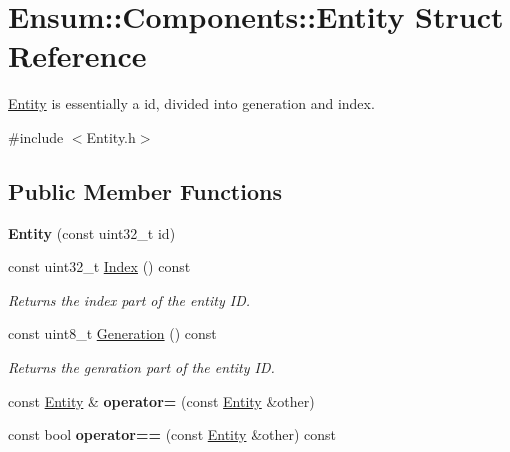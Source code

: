 \hypertarget{struct_ensum_1_1_components_1_1_entity}{}\section{Ensum\+:\+:Components\+:\+:Entity Struct Reference}
\label{struct_ensum_1_1_components_1_1_entity}


\hyperlink{struct_ensum_1_1_components_1_1_entity}{Entity} is essentially a id, divided into generation and index.  




{\ttfamily \#include $<$Entity.\+h$>$}

\subsection*{Public Member Functions}
\begin{DoxyCompactItemize}
\item 
{\bfseries Entity} (const uint32\+\_\+t id)\hypertarget{struct_ensum_1_1_components_1_1_entity_a4eacdb9354583a1b2a946c4b18ec32af}{}\label{struct_ensum_1_1_components_1_1_entity_a4eacdb9354583a1b2a946c4b18ec32af}

\item 
const uint32\+\_\+t \hyperlink{struct_ensum_1_1_components_1_1_entity_a166ed226733f98a44407dea8d00d3293}{Index} () const \hypertarget{struct_ensum_1_1_components_1_1_entity_a166ed226733f98a44407dea8d00d3293}{}\label{struct_ensum_1_1_components_1_1_entity_a166ed226733f98a44407dea8d00d3293}

\begin{DoxyCompactList}\small\item\em Returns the index part of the entity ID. \end{DoxyCompactList}\item 
const uint8\+\_\+t \hyperlink{struct_ensum_1_1_components_1_1_entity_addbbcdac8d8fc445292ec8da5f72715e}{Generation} () const \hypertarget{struct_ensum_1_1_components_1_1_entity_addbbcdac8d8fc445292ec8da5f72715e}{}\label{struct_ensum_1_1_components_1_1_entity_addbbcdac8d8fc445292ec8da5f72715e}

\begin{DoxyCompactList}\small\item\em Returns the genration part of the entity ID. \end{DoxyCompactList}\item 
const \hyperlink{struct_ensum_1_1_components_1_1_entity}{Entity} \& {\bfseries operator=} (const \hyperlink{struct_ensum_1_1_components_1_1_entity}{Entity} \&other)\hypertarget{struct_ensum_1_1_components_1_1_entity_a671dfaa0d8f92f61b3203104770cbc5e}{}\label{struct_ensum_1_1_components_1_1_entity_a671dfaa0d8f92f61b3203104770cbc5e}

\item 
const bool {\bfseries operator==} (const \hyperlink{struct_ensum_1_1_components_1_1_entity}{Entity} \&other) const \hypertarget{struct_ensum_1_1_components_1_1_entity_af839a9836c7ae43b1a1d5216119cea2d}{}\label{struct_ensum_1_1_components_1_1_entity_af839a9836c7ae43b1a1d5216119cea2d}

\end{DoxyCompactItemize}
